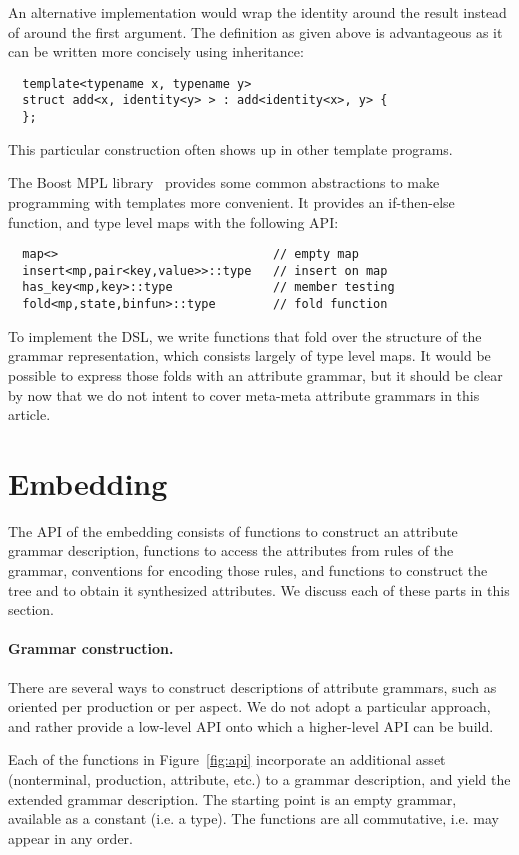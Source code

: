 \documentclass{llncs}
\begin{document}
  An alternative implementation would wrap the
  identity around the result instead of around the
  first argument. The definition as given above is
  advantageous as it can be written more concisely
  using inheritance:
  \begin{lstlisting}
  template<typename x, typename y>
  struct add<x, identity<y> > : add<identity<x>, y> {
  };
  \end{lstlisting}
  This particular construction often shows up in other
  template programs.

  The Boost MPL library~\cite{boost} provides some
  common abstractions
  to make programming with templates more convenient.  
  It provides an if-then-else function, and
  type level maps with the following API:
  \begin{lstlisting}
  map<>                              // empty map
  insert<mp,pair<key,value>>::type   // insert on map
  has_key<mp,key>::type              // member testing
  fold<mp,state,binfun>::type        // fold function
  \end{lstlisting}
  To implement the DSL, we write functions that fold
  over the structure of the grammar representation,
  which consists largely of type level maps.
  It would be possible to express those folds with
  an attribute grammar, but it should be clear by
  now that we do not intent to cover meta-meta
  attribute grammars in this article.

\section{Embedding}
\label{sect:api}

  The API of the embedding consists of functions to
  construct an attribute grammar description,
  functions to access the attributes from rules of
  the grammar, conventions for encoding those rules,
  and functions to construct the tree and to obtain
  it synthesized attributes.
  We discuss each of these parts in this section.

  \paragraph{Grammar construction.}
  There are several ways to construct descriptions of
  attribute grammars,
  such as oriented per production or per aspect. We do not
  adopt a particular approach, and rather provide a
  low-level API onto which a higher-level API can be build.

  Each of the functions in Figure~\ref{fig:api}
  incorporate an additional asset (nonterminal,
  production, attribute, etc.) to a grammar description,
  and yield the extended
  grammar description. The starting point is an empty
  grammar, available as a constant (i.e. a type).
  The functions are all commutative, i.e. may appear
  in any order. 
\end{document}
